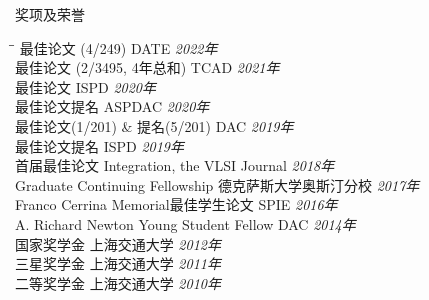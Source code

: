 
\begin{rSection}{奖项及荣誉}
\begin{tabbing}
\hspace{3.8in}\= \hspace{2.6in}\= \kill
最佳论文 (4/249) \> DATE \> {\em 2022年 } \\
最佳论文 (2/3495, 4年总和) \> TCAD \> {\em 2021年 } \\
最佳论文 \> ISPD \> {\em 2020年 } \\
最佳论文提名 \> ASPDAC \> {\em 2020年 } \\
最佳论文(1/201) \& 提名(5/201) \> DAC \> {\em 2019年 } \\
最佳论文提名 \> ISPD \> {\em 2019年 } \\
首届最佳论文 \> Integration, the VLSI Journal \> {\em 2018年 } \\
Graduate Continuing Fellowship \> 德克萨斯大学奥斯汀分校 \> {\em 2017年 } \\
Franco Cerrina Memorial最佳学生论文 \> SPIE \> {\em 2016年 } \\
A. Richard Newton Young Student Fellow \> DAC \> {\em 2014年 } \\
国家奖学金 \> 上海交通大学 \> {\em 2012年 } \\
三星奖学金 \> 上海交通大学 \> {\em 2011年 } \\
二等奖学金 \> 上海交通大学 \> {\em 2010年 }
\end{tabbing}
\end{rSection}

